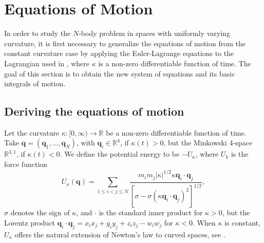 \documentclass[12pt]{amsart}
\theoremstyle{definition}
\def \mb{\mathbb}
\def \R{\mb R}                 %
\newcommand {\q} {\mathbf{q}}
\begin{document}
{%
\section{Equations of Motion}

In order to study the $N$-body problem in spaces with uniformly varying curvature, it is first necessary to generalize the equations of motion from the  constant curvature case by applying the Euler-Lagrange equations to the Lagrangian used in \cite{Diacu}, where $\kappa$ is a non-zero differentiable function of time. The goal of this section is to obtain the new system of equations and its basic integrals of motion.

\subsection{Deriving the equations of motion}

Let the curvature $\kappa:[0, \infty) \to \R$ be a non-zero differentiable function of time. Take $\q=(\q_1,\ldots, \q_N)$, with $\q_i \in \R^4$, if $\kappa(t) > 0$, but the Minkowski 4-space $\R^{3,1}$, if $\kappa(t) < 0$.
We define the potential energy to be $-U_\kappa$, where $U_k$ is the force function\begin{equation}\label{equ:potential}
U_\kappa(\q)= \sum\limits_{1 \leq i < j \leq N} \frac{m_i m_j |\kappa|^{1/2} \kappa \q_i \cdot \q_j} {[\sigma-\sigma(\kappa \q_i \cdot \q_j)^2]^{1/2}},\end{equation}
$\sigma$ denotes the sign of $\kappa$, and $\cdot$ is the standard inner product for $\kappa>0$, but the Lorentz product $\q_i \cdot \q_j=x_ix_j+y_iy_j+z_iz_j-w_iw_j$ for $\kappa<0$. When $\kappa$ is constant, $U_\kappa$ offers the natural extension of Newton's law to curved spaces, see \cite{Diacu}. 

}
\end{document}
